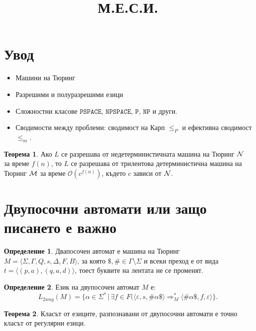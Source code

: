 \documentclass[a4paper]{article}
\title{М.Е.С.И.}
\theoremstyle{definition}
\newtheorem{theorem}{Теорема}
\newtheorem{definition}{Определение}
\begin{document}
\maketitle

\section{Увод}

\begin{itemize}
\item
  Машини на Тюринг
\item
  Разрешими и полуразрешими езици
\item
  Сложностни класове $\texttt{PSPACE}$, $\texttt{NPSPACE}$, $\texttt{P}$, $\texttt{NP}$ и други.
\item
  Сводимости между проблеми: сводимост на Карп $\leq_P$ и ефективна сводимост $\leq_m$.
\end{itemize}

\begin{theorem}
  Ако $L$ се разрешава от недетерминистичната машина на Тюринг $\mathcal{N}$ за време $f(n)$, то
  $L$ се разрешава от трилентова детерминистична машина на Тюринг $\mathcal{M}$ за време $\mathcal{O}(c^{f(n)})$, където $c$ зависи от $\mathcal{N}$.
\end{theorem}

\section{Двупосочни автомати или защо писането е важно}
\begin{definition}
Двапосочен автомат е машина на Тюринг $M=\langle \Sigma,\Gamma,Q,s,\Delta,F,B\rangle$, за която
$\$,\#\in \Gamma\setminus\Sigma$ и  всеки преход е от вида $t=\langle (p,a),(q,a,d)\rangle$, тоест буквите на лентата не се променят.
\end{definition}
\begin{definition}
Език на двупосочен автомат $M$ е:
\begin{equation*}
L_{2way}(M)=\{\alpha \in \Sigma^*\,|\,\exists f\in F( \langle \varepsilon,s,\#\alpha\$\rangle \Rightarrow_M^* \langle \#\alpha\$,f,\varepsilon\rangle\}.
\end{equation*}
\end{definition}
\begin{theorem}
Класът от езиците, разпознавани от двупосочни автомати е точно класът от регулярни езици.
\end{theorem}
\end{document}
